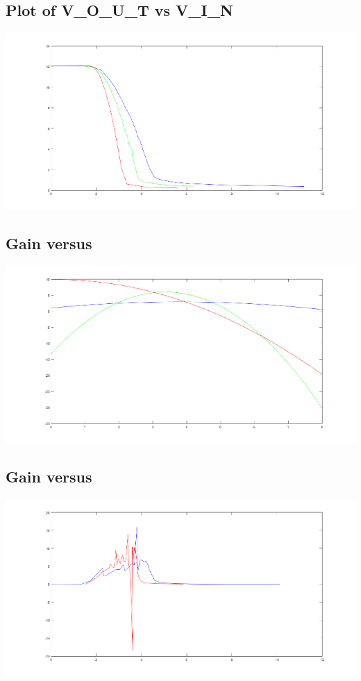 \subsection*{Plot of V_O_U_T vs V_I_N}
\begin{center}
    \includegraphics{data.png}
\end{center}

\subsection*{Gain versus }
\begin{center}
    \includegraphics{gain.png}
\end{center}

\subsection*{Gain versus }
\begin{center}
    \includegraphics{gain_data.png}
\end{center}

